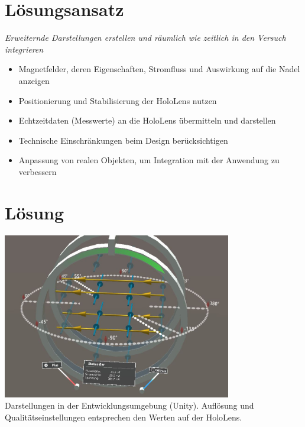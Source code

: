 \part{Lösungsansatz}
\label{part:solution}
\begin{frame}[fragile]{}
	\textit{Erweiternde Darstellungen erstellen und räumlich wie zeitlich in den Versuch integrieren}
	\pause
	\begin{itemize}
		\item Magnetfelder, deren Eigenschaften, Stromfluss und Auswirkung auf die Nadel anzeigen
		\item Positionierung und Stabilisierung der HoloLens nutzen		
		\item Echtzeitdaten (Messwerte) an die HoloLens übermitteln und darstellen
		\item Technische Einschränkungen beim Design berücksichtigen
		\item Anpassung von realen Objekten, um Integration mit der Anwendung zu verbessern
	\end{itemize}
\end{frame}

\part{Lösung}
\begin{frame}[fragile]{}
	\vspace{-10px}
	\centering
	\includegraphics[width=0.75\textwidth]{images/unity/overview.jpg}\\
	\scriptsize Darstellungen in der Entwicklungsumgebung (Unity). Auflösung und Qualitätseinstellungen entsprechen den Werten auf der HoloLens.
\end{frame}

